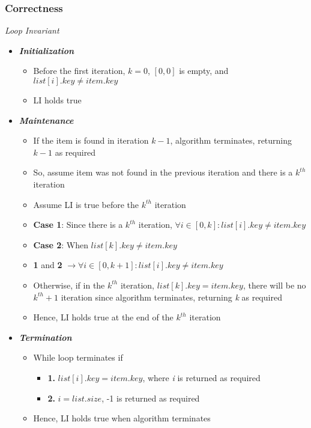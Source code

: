 \documentclass[10pt, 
a4paper, 
oneside, 
headinclude, footinclude, 
BCOR5mm]
{scrartcl}
\begin{document}
\subsubsection{Correctness}
\begin{definition}
    \textit{Loop Invariant}
    \begin{itemize}
        \item \textit{\textbf{Initialization}}
        \begin{itemize}
            \item Before the first iteration, $k=0$, $[0,0]$ is empty, and $list[i].key \neq item.key$
            \item LI holds true
        \end{itemize}
        \item \textit{\textbf{Maintenance}}
        \begin{itemize}
            \item If the item is found in iteration $k-1$, algorithm terminates, returning $k-1$ as required
            \item So, assume item was not found in the previous iteration and there is a $k^{th}$ iteration
            \item Assume LI is true before the $k^{th}$ iteration
            \item \textbf{Case 1}: Since there is a $k^{th}$ iteration, $\forall i \in[0,k]: list[i].key\neq item.key$
            \item \textbf{Case 2}: When $list[k].key\neq item.key$
            \item \textbf{1} and \textbf{2} $\rightarrow \forall i \in[0,k+1]: list[i].key\neq item.key$
            \item Otherwise, if in the $k^{th}$ iteration, $list[k].key = item.key$, there will be no $k^{th}+1$ iteration since algorithm terminates, returning \textit{k} as required
            \item Hence, LI holds true at the end of the $k^{th}$ iteration
        \end{itemize}
        \item \textit{\textbf{Termination}}
        \begin{itemize}
            \item While loop terminates if
            \begin{itemize}
                \item \textbf{1.} $list[i].key=item.key$, where \textit{i} is returned as required
                \item \textbf{2.} $i=list.size$, -1 is returned as required
            \end{itemize}
            \item Hence, LI holds true when algorithm terminates
        \end{itemize}
    \end{itemize}
\end{definition}
\newpage
\end{document}
